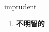 
\begin{frame}
{\huge imprudent}
\begin{center}
\begin{enumerate}\Large
  \item \textbf{不明智的}
\end{enumerate}
\end{center}
\end{frame}

